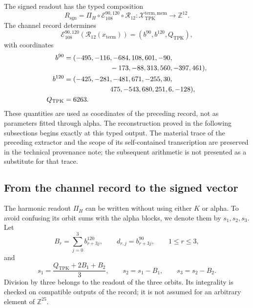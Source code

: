 The signed readout has the typed composition
\begin{equation}
 R_{\mathrm{sgn}}
 =\Pi_H\circ\mathcal E_{108}^{90,120}\circ\mathcal R_{12}:
 \mathcal X_{\mathrm{TPK}}^{\mathrm{term,mem}}
 \longrightarrow\mathbb Z^{12}.
 \label{eq:k-lector-firmado}
\end{equation}
The channel record determines
\[
 \mathcal E_{108}^{90,120}(\mathcal R_{12}(x_{\mathrm{term}}))
 =(b^{90},b^{120},Q_{\mathrm{TPK}}),
\]
with coordinates
\begin{align*}
 b^{90}={}&(-495,-116,-684,108,601,-90,\\
            &\hspace{19mm}-173,-88,313,560,-397,461),\\
 b^{120}={}&(-425,-281,-481,671,-255,30,\\
             &\hspace{19mm}475,-543,680,251,6,-128),\\
 Q_{\mathrm{TPK}}={}&6263.
\end{align*}
These quantities are used as coordinates of the preceding record, not
as parameters fitted through alpha. The reconstruction proved
in the following subsections begins exactly at this typed output.
The material trace of the preceding extractor and the scope of its
self-contained transcription are preserved in the technical provenance note; the subsequent
arithmetic is not presented as a substitute for that trace.

\subsection{From the channel record to the signed vector}
\label{subsec:k-pi-h}

The harmonic readout \(\Pi_H\) can be written without using either \(K\) or
alpha. To avoid confusing its orbit sums with the alpha blocks,
we denote them by \(s_1,s_2,s_3\). Let
\[
 B_r=\sum_{j=0}^{3}b^{120}_{r+3j},\qquad
 d_{r,j}=b^{90}_{r+3j},\qquad1\leq r\leq3,
\]
and
\begin{equation}
 s_1=\frac{Q_{\mathrm{TPK}}+2B_1+B_2}{3},\qquad
 s_2=s_1-B_1,\qquad s_3=s_2-B_2.
 \label{eq:k-sumas-armonicas}
\end{equation}
Division by three belongs to the readout of the three orbits. Its
integrality is checked on compatible outputs of the record; it is not
assumed for an arbitrary element of \(\mathbb Z^{25}\).

